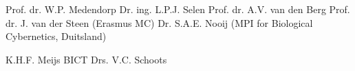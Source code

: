 
\clearpage


\noindent {}
\noindent \npar Prof. dr. W.P. Medendorp
\npar
\noindent {}
\noindent \npar Dr. ing. L.P.J. Selen
\npar
\vspace{0.5cm}
\noindent {}
\noindent \npar Prof. dr. A.V. van den Berg
\noindent \npar Prof. dr. J. van der Steen (Erasmus MC)
\noindent \npar Dr. S.A.E. Nooij (MPI for Biological Cybernetics, Duitsland)

\vfill

\noindent {}
\noindent \npar K.H.F. Meijs BICT
\noindent \npar Drs. V.C. Schoots
